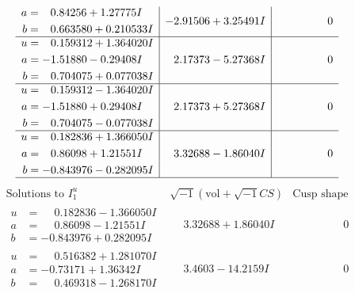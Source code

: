 \documentclass[1p]{elsarticle_modified}
\theoremstyle{definition}
\newcommand{\I}{\sqrt{-1}}
\begin{document}
$$\begin{array}{c|c|c}
\begin{aligned}
a &= \phantom{-}0.84256 + 1.27775 I \\
b &= \phantom{-}0.663580 + 0.210533 I\end{aligned}
 & -2.91506 + 3.25491 I & \phantom{-0.000000 } 0 \\ \hline\begin{aligned}
u &= \phantom{-}0.159312 + 1.364020 I \\
a &= -1.51880 - 0.29408 I \\
b &= \phantom{-}0.704075 + 0.077038 I\end{aligned}
 & \phantom{-}2.17373 - 5.27368 I & \phantom{-0.000000 } 0 \\ \hline\begin{aligned}
u &= \phantom{-}0.159312 - 1.364020 I \\
a &= -1.51880 + 0.29408 I \\
b &= \phantom{-}0.704075 - 0.077038 I\end{aligned}
 & \phantom{-}2.17373 + 5.27368 I & \phantom{-0.000000 } 0 \\ \hline\begin{aligned}
u &= \phantom{-}0.182836 + 1.366050 I \\
a &= \phantom{-}0.86098 + 1.21551 I \\
b &= -0.843976 - 0.282095 I\end{aligned}
 & \phantom{-}3.32688 - 1.86040 I & \phantom{-0.000000 } 0\\
 \hline 
 \end{array}$$\newpage$$\begin{array}{c|c|c}  
\text{Solutions to }I^u_{1}& \I (\text{vol} + \sqrt{-1}CS) & \text{Cusp shape}\\
 \hline 
\begin{aligned}
u &= \phantom{-}0.182836 - 1.366050 I \\
a &= \phantom{-}0.86098 - 1.21551 I \\
b &= -0.843976 + 0.282095 I\end{aligned}
 & \phantom{-}3.32688 + 1.86040 I & \phantom{-0.000000 } 0 \\ \hline\begin{aligned}
u &= \phantom{-}0.516382 + 1.281070 I \\
a &= -0.73171 + 1.36342 I \\
b &= \phantom{-}0.469318 - 1.268170 I\end{aligned}
 & \phantom{-}3.4603 - 14.2159 I & \phantom{-0.000000 } 0 \\ \hline\begin{aligned}

\end{aligned}
\end{array}$$
\end{document}
